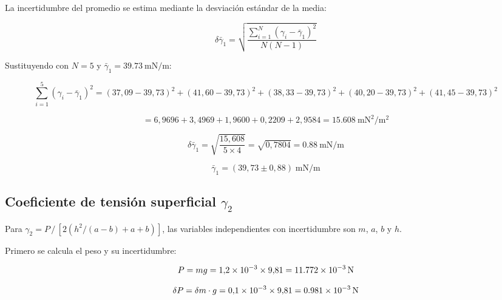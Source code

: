 \begin{appendices}
La incertidumbre del promedio se estima mediante la desviación estándar
de la media:

\begin{equation}
    \delta\bar{\gamma}_1
    = \sqrt{\frac{\displaystyle\sum_{i=1}^{N}(\gamma_i - \bar{\gamma}_1)^2}
                 {N(N-1)}}
\end{equation}

Sustituyendo con $N = 5$ y
$\bar{\gamma}_1 = \qty{39,73}{\milli\newton\per\meter}$:

\begin{equation*}
    \sum_{i=1}^{5}(\gamma_i - \bar{\gamma}_1)^2
    = (37{,}09-39{,}73)^2 + (41{,}60-39{,}73)^2 + (38{,}33-39{,}73)^2
      + (40{,}20-39{,}73)^2 + (41{,}45-39{,}73)^2
\end{equation*}

\begin{equation*}
    = 6{,}9696 + 3{,}4969 + 1{,}9600 + 0{,}2209 + 2{,}9584
    = \qty{15,608}{\milli\newton\squared\per\meter\squared}
\end{equation*}

\begin{equation*}
    \delta\bar{\gamma}_1
    = \sqrt{\frac{15{,}608}{5 \times 4}}
    = \sqrt{0{,}7804}
    = \qty{0,88}{\milli\newton\per\meter}
\end{equation*}

\begin{equation*}
    \boxed{\bar{\gamma}_1 = (39{,}73 \pm 0{,}88)\;\si{\milli\newton\per\meter}}
\end{equation*}

\subsection{Coeficiente de tensión superficial \texorpdfstring{$\gamma_2$}{gamma\_2}}

Para $\gamma_2 = P\,/\,[2(h^2/(a-b)+a+b)]$, las variables
independientes con incertidumbre son $m$, $a$, $b$ y $h$.

Primero se calcula el peso y su incertidumbre:

\begin{equation*}
    P = mg = 1{,}2\times10^{-3} \times 9{,}81 = \qty{11{,}772e-3}{\newton}
\end{equation*}

\begin{equation*}
    \delta P = \delta m \cdot g
    = 0{,}1\times10^{-3} \times 9{,}81
    = \qty{0{,}981e-3}{\newton}
\end{equation*}


\end{appendices}
